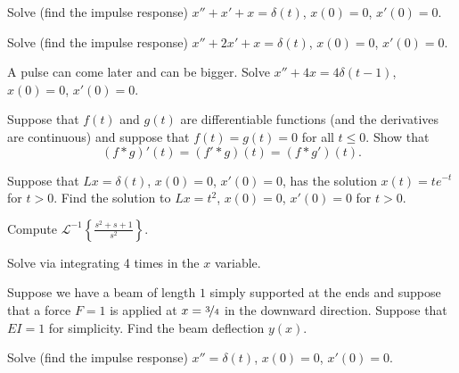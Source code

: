 \begin{exercise}
Solve (find the impulse response)
$x'' + x' + x = \delta(t)$, $x(0) = 0$, $x'(0)=0$.
\end{exercise}

\begin{exercise}
Solve (find the impulse response)
$x'' + 2 x' + x = \delta(t)$, $x(0) = 0$, $x'(0)=0$.
\end{exercise}

\begin{exercise}
A pulse can come later and can be bigger.
Solve 
$x'' + 4 x = 4\delta(t-1)$, $x(0) = 0$, $x'(0)=0$.
\end{exercise}

\begin{exercise}
Suppose that $f(t)$ and $g(t)$ are differentiable functions
(and the derivatives are continuous)
and suppose that $f(t) = g(t) = 0$ for all $t \leq 0$.  Show that
\begin{equation*}
(f * g)'(t) = (f' * g)(t) = (f * g')(t) .
\end{equation*}
\end{exercise}

\begin{exercise}
Suppose that $L x = \delta(t)$, $x(0) = 0$, $x'(0) = 0$, has the solution
$x(t) = t e^{-t}$ for $t > 0$.  Find the solution to
$Lx = t^2$, $x(0) = 0$, $x'(0) = 0$ for $t > 0$.
\end{exercise}

\begin{exercise}
Compute
${\mathcal{L}}^{-1} \left\{ \frac{s^2+s+1}{s^2} \right\}$.
\end{exercise}

\begin{exercise}[challenging]
Solve  via integrating 4 times in the $x$ variable.
\end{exercise}

\begin{exercise}
Suppose we have a beam of length $1$ simply supported at the ends and
suppose that a force $F=1$ is applied at $x=\nicefrac{3}{4}$ in the downward
direction.  Suppose that $EI=1$ for simplicity.  Find the beam deflection
$y(x)$.
\end{exercise}

\setcounter{exercise}{100}

\begin{exercise}
Solve (find the impulse response)
$x'' = \delta(t)$, $x(0) = 0$, $x'(0)=0$.
\end{exercise}

